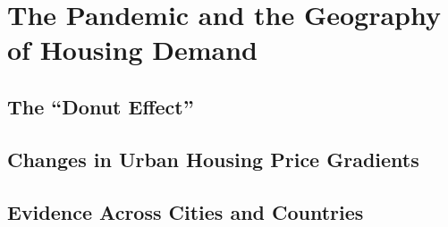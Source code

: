 \documentclass[11pt]{article}
\begin{document}
\section{The Pandemic and the Geography of Housing Demand}

%
%


\subsection{The ``Donut Effect''}

%
%


\subsection{Changes in Urban Housing Price Gradients}

%
%
%


\subsection{Evidence Across Cities and Countries}

%
%
%
\end{document}
